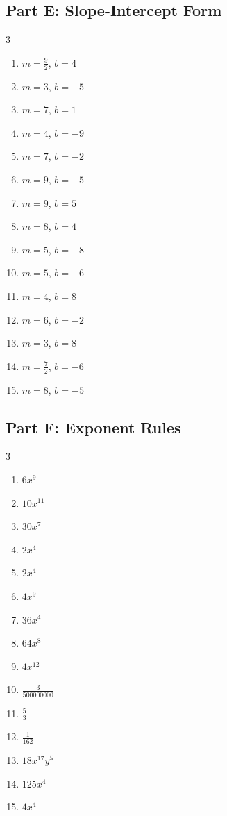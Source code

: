 \documentclass[11pt]{article}
\begin{document}
\subsection*{Part E: Slope-Intercept Form}
\begin{multicols}{3}
\begin{enumerate}
  \item $m = \frac{9}{2}$, \quad $b = 4$
  \item $m = 3$, \quad $b = -5$
  \item $m = 7$, \quad $b = 1$
  \item $m = 4$, \quad $b = -9$
  \item $m = 7$, \quad $b = -2$
  \item $m = 9$, \quad $b = -5$
  \item $m = 9$, \quad $b = 5$
  \item $m = 8$, \quad $b = 4$
  \item $m = 5$, \quad $b = -8$
  \item $m = 5$, \quad $b = -6$
  \item $m = 4$, \quad $b = 8$
  \item $m = 6$, \quad $b = -2$
  \item $m = 3$, \quad $b = 8$
  \item $m = \frac{7}{2}$, \quad $b = -6$
  \item $m = 8$, \quad $b = -5$
\end{enumerate}
\end{multicols}
\subsection*{Part F: Exponent Rules}
\begin{multicols}{3}
\begin{enumerate}
  \item $6 x^{9}$
  \item $10 x^{11}$
  \item $30 x^{7}$
  \item $2 x^{4}$
  \item $2 x^{4}$
  \item $4 x^{9}$
  \item $36 x^{4}$
  \item $64 x^{8}$
  \item $4 x^{12}$
  \item $\frac{3}{500000000}$
  \item $\frac{5}{3}$
  \item $\frac{1}{162}$
  \item $18 x^{17} y^{5}$
  \item $125 x^{4}$
  \item $4 x^{4}$
\end{enumerate}
\end{multicols}
\end{document}
